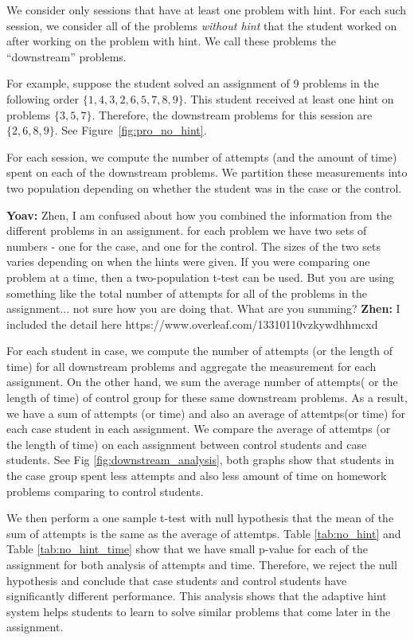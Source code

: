 \documentclass{llncs2e/llncs}
\begin{document}
We consider only sessions that have at least one problem with
hint. For each such session, we consider all of the problems {\em
  without hint} that the student worked on after working on the
problem with hint. We call these problems the ``downstream'' problems.

For example, suppose the student solved an assignment of 9 problems in the
following order $\{ 1, 4, 3, 2, 6, 5, 7, 8, 9\}$. This student
received at least one hint on problems $\{3, 5, 7\}$. Therefore, the
downstream problems for this session are $\{2, 6, 8, 9\}$. See
Figure~\ref{fig:pro_no_hint}.

For each session, we compute the number of attempts (and the amount of
time) spent on each of the downstream problems. We partition these
measurements into two population depending on whether the student was
in the case or the control.

{\bf Yoav:} Zhen, I am confused about how you combined the information
from the different problems in an assignment. for each problem we have
two sets of numbers - one for the case, and one for the control. The
sizes of the two sets varies depending on when the hints were
given. If you were comparing one problem at a time, then a
two-population t-test can be used. But you are using something like
the total number of attempts for all of the problems in the
assignment... not sure how you are doing that. What are you summing?
{\bf Zhen:} I included the detail here https://www.overleaf.com/13310110vzkywdhhmcxd

For each student in case, we compute the number of attempts (or the length of time) for all downstream problems and aggregate the measurement for each assignment. On the other hand, we sum the average number of attempts( or the length of time) of control group for these same downstream problems. As a result, we have a sum of attempts (or time) and also an average of attemtps(or time) for each case student in each assignment. We compare the average of attemtps (or the length of time) on each assignment between control students and case students. See Fig \ref{fig:downstream_analysis}, both graphs show that students in the case group spent less attempts and also less amount of time on homework problems comparing to control students.

We then perform a one sample t-test with null hypothesis that the mean of the sum of attempts is the same as the average of attemtps. Table \ref{tab:no_hint} and Table \ref{tab:no_hint_time} show that we have small p-value for each of the assignment for both analysis of attempts and time. Therefore, we reject the null hypothesis and conclude that case students and control students have significantly different performance. This analysis shows that the adaptive hint system helps students to learn to solve similar problems that come later in the assignment. 
\end{document}
